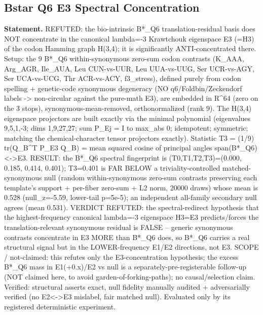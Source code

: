\subsection{Bstar Q6 E3 Spectral Concentration}\label{sec:bridge-bstar-q6-e3-spectral-concentration}
\textbf{Statement.} REFUTED: the bio-intrinsic B*\_Q6 translation-residual basis does NOT concentrate in the canonical
lambda=-3 Krawtchouk eigenspace E3 (=H3) of the codon Hamming graph H(3,4); it is significantly
ANTI-concentrated there. Setup: the 9 B*\_Q6 within-synonymous zero-sum codon contrasts (K\_AAA,
Arg\_AGR, Ile\_AUA, Leu CUN-vs-UUR, Leu UUA-vs-UUG, Ser UCR-vs-AGY, Ser UCA-vs-UCG, Thr ACR-vs-ACY,
f3\_stress), defined purely from codon spelling + genetic-code synonymous degeneracy (NO
q6/Foldbin/Zeckendorf labels -> non-circular against the pure-math E3), are embedded in
R\textasciicircum{}64 (zero on the 3 stops), synonymous-mean-removed, orthonormalized (rank 9). The
H(3,4) eigenspace projectors are built exactly via the minimal polynomial (eigenvalues 9,5,1,-3;
dims 1,9,27,27; sum P\_Ej = I to max\_abs 0; idempotent; symmetric; matching the chemical-character
tensor projectors exactly). Statistic T3 = (1/9) tr(Q\_B\textasciicircum{}T P\_E3 Q\_B) = mean
squared cosine of principal angles span(B*\_Q6)<->E3. RESULT: the B*\_Q6 spectral fingerprint is
(T0,T1,T2,T3)=(0.000, 0.185, 0.414, 0.401); T3=0.401 is FAR BELOW a triviality-controlled
matched-synonymous null (random within-synonymous zero-sum contrasts preserving each template's
support + per-fiber zero-sum + L2 norm, 20000 draws) whose mean is 0.528 (null\_z=-5.59, lower-tail
p=5e-5); an independent all-family secondary null agrees (mean 0.531). VERDICT REFUTED: the
spectral-redirect hypothesis that the highest-frequency canonical lambda=-3 eigenspace H3=E3
predicts/forces the translation-relevant synonymous residual is FALSE -- generic synonymous
contrasts concentrate in E3 MORE than B*\_Q6 does, so B*\_Q6 carries a real structural signal but in
the LOWER-frequency E1/E2 directions, not E3. SCOPE / not-claimed: this refutes only the
E3-concentration hypothesis; the excess B*\_Q6 mass in E1(+0.x)/E2 vs null is a
separately-pre-registerable follow-up (NOT claimed here, to avoid garden-of-forking-paths); no
causal/selection claim. Verified: structural asserts exact, null fidelity manually audited +
adversarially verified (no E2<->E3 mislabel, fair matched null). Evaluated only by its registered
deterministic experiment.

